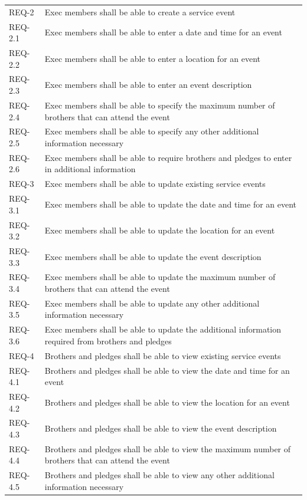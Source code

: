 \documentclass{article}
\newcommand{\req}[1]{REQ-{#1}}
\begin{document}
\begin{tabular}{lp{8cm}}
\req{2} & Exec members shall be able to create a service event \\
\req{2.1} & Exec members shall be able to enter a date and time for an
event\\
\req{2.2} & Exec members shall be able to enter a location for an
event\\
\req{2.3} & Exec members shall be able to enter an event description
\\
\req{2.4} & Exec members shall be able to specify the maximum number
of brothers that can attend the event\\
\req{2.5} & Exec members shall be able to specify any other additional
information necessary \\
\req{2.6} & Exec members shall be able to require brothers and pledges
to enter in
additional information\\
\req{3} & Exec members shall be able to update existing service events
\\
\req{3.1} & Exec members shall be able to update the date and time for an
event\\
\req{3.2} & Exec members shall be able to update the location for an
event\\
\req{3.3} & Exec members shall be able to update the event description
\\
\req{3.4} & Exec members shall be able to update the maximum number
of brothers that can attend the event\\
\req{3.5} & Exec members shall be able to update any other additional
information necessary \\
\req{3.6} & Exec members shall be able to update the additional
information required from brothers and pledges\\
\req{4} & Brothers and pledges shall be able to view existing service
events \\
\req{4.1} & Brothers and pledges shall be able to view the date and time for an
event\\
\req{4.2} & Brothers and pledges shall be able to view the location for an
event\\
\req{4.3} & Brothers and pledges shall be able to view the event description
\\
\req{4.4} & Brothers and pledges shall be able to view the maximum number
of brothers that can attend the event\\
\req{4.5} & Brothers and pledges shall be able to view any other additional
information necessary \\

\end{tabular}
\end{document}
